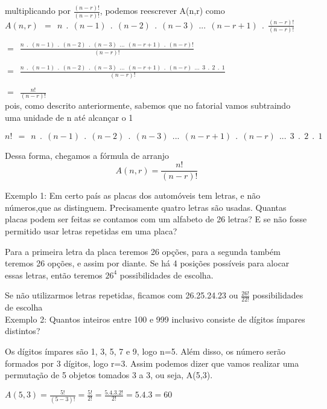 \noindent
multiplicando por $\frac{(n-r)!}{(n-r)!}$, podemos reescrever A(n,r) como\\

$A(n,r)\ \ =\ \ n\ \ .\ \ (n-1)\ \ .\ \ (n-2)\ \ .\ \ (n-3)\ \ ...\ \ (n-r+1)\ \ .\ \ \frac{(n-r)!}{(n-r)!}$

\hspace{\parindent}
$=\ \ \frac{n\ \ .\ \ (n-1)\ \ .\ \ (n-2)\ \ .\ \ (n-3)\ \ ...\ \ (n-r+1)\ \ .\ \ (n-r)!}{(n-r)!}$ 

\hspace{\parindent}
$=\ \ \frac{n\ \ .\ \ (n-1)\ \ .\ \ (n-2)\ \ .\ \ (n-3)\ \ ...\ \ (n-r+1)\ \ .\ \ (n-r)\ \ ...\ \ 3\ \ . \ \ 2 \ \ . \ \ 1}{(n-r)!}$ 

\hspace{\parindent}
$=\ \ \frac{n!}{(n-r)!}$\\

\noindent
pois, como descrito anteriormente, sabemos que no fatorial vamos subtraindo uma unidade de n até alcançar o 1

\begin{center}
	$n!\ \ =\ \ n\ \ .\ \ (n-1)\ \ .\ \ (n-2)\ \ .\ \ (n-3)\ \ ...\ \ (n-r+1)\ \ .\ \ (n-r)\ \ ...\ \ 3\ \ . \ \ 2 \ \ . \ \ 1$
\end{center}

\noindent
Dessa forma, chegamos a fórmula de arranjo
\begin{equation}
A(n,r) = \frac{n!}{(n-r)!}
\end{equation}

\noindent
Exemplo 1: Em certo país as placas dos automóveis tem letras, e não números,que as distinguem. Precisamente quatro letras são usadas. Quantas placas podem ser feitas se contamos com um alfabeto de 26 letras? E se não fosse permitido usar letras repetidas em uma placa?

Para a primeira letra da placa teremos 26 opções, para a segunda também teremos 26 opções, e assim por diante. Se há 4 posições possíveis para alocar essas letras, então teremos $26^4$ possibilidades de escolha.

Se não utilizarmos letras repetidas, ficamos com 26.25.24.23 ou  $\frac{26!}{22!}$ possibilidades de escolha\\

\noindent
Exemplo 2: Quantos inteiros entre 100 e 999 inclusivo consiste de dígitos ímpares distintos?

Os dígitos ímpares são 1, 3, 5, 7 e 9, logo n=5. Além disso, os número serão formados por 3 dígitos, logo r=3. Assim podemos dizer que vamos realizar uma permutação de 5 objetos tomados 3 a 3, ou seja, A(5,3).

\begin{center}
	$A(5,3) = \frac{5!}{(5-3)!}= \frac{5!}{2!}=\frac{5.4.3.2!}{2!}=5.4.3=60$
\end{center}


